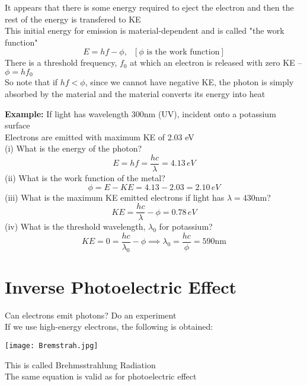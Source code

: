 \documentclass[a4paper, 11pt, fleqn, normalem]{report}
\begin{document}
It appears that there is some energy required to eject the electron and then the rest of the energy is transfered to KE \\
This initial energy for emission is material-dependent and is called "the work function"
\begin{equation*}
    E = hf - \phi,~~~[\phi\text{ is the work function}]
\end{equation*}
There is a threshold frequency, $f_{0}$ at which an electron is released with zero KE -- $\phi = hf_{0}$ \\
So note that if $hf < \phi$, since we cannot have negative KE, the photon is simply absorbed by the material and the material converts its energy into heat

\textbf{Example: }If light has wavelength 300nm (UV), incident onto a potassium surface \\
Electrons are emitted with maximum KE of 2.03 eV \\
(i) What is the energy of the photon?
\begin{equation*}
    E = hf = \frac{hc}{\lambda} = 4.13\,eV
\end{equation*}
(ii) What is the work function of the metal?
\begin{equation*}
    \phi = E - KE = 4.13 - 2.03 = 2.10\,eV
\end{equation*}
(iii) What is the maximum KE emitted electrons if light has $\lambda = 430$nm?
\begin{equation*}
    KE = \frac{hc}{\lambda} - \phi = 0.78\,eV
\end{equation*}
(iv) What is the threshold wavelength, $\lambda_{0}$ for potassium?
\begin{equation*}
    KE = 0 = \frac{hc}{\lambda_{0}} - \phi \implies \lambda_{0} = \frac{hc}{\phi} = 590\text{nm}
\end{equation*}

\section{Inverse Photoelectric Effect}
Can electrons emit photons? Do an experiment \\
If we use high-energy electrons, the following is obtained:

\texttt{[image: Bremstrah.jpg]}

This is called Brehmsstrahlung Radiation \\
The same equation is valid as for photoelectric effect
\end{document}
